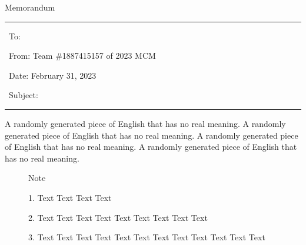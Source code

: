 \documentclass[12pt]{ctexart}
\begin{document}
\begin{letter}{ \centering Memorandum }
	
	\noindent\rule{\textwidth}{1pt}

	\vspace{-0.2cm}

	\noindent \ To: 

	\vspace{-0.2cm}

	\noindent \ From: Team \#1887415157 of 2023 MCM

	\vspace{-0.2cm}

	\noindent \ Date: February 31, 2023

	\vspace{-0.2cm}

	\noindent \ Subject:

	\vspace{-0.4cm}

	\noindent\rule{\textwidth}{1pt}

	A randomly generated piece of English that has no real meaning. A randomly generated piece of English that has no real meaning. A randomly generated piece of English that has no real meaning. A randomly generated piece of English that has no real meaning. 

	\begin{figure}%
	\centering
	\begin{tcolorbox}
		[
		colback=yellow!9!white,%
		colframe=white!75!white,%
		width=7cm,%
		arc=5mm, auto outer arc,
		boxrule=0.5pt,
		]
		
		\vspace{0.2cm}
		
		\begin{center}
			\fontsize{20pt}{1}\selectfont{}
			Note
		\end{center}

		\vspace{-0.2cm}

		1. Text Text Text Text
		
		2. Text Text Text Text Text Text Text Text Text
		
		3. Text Text Text Text Text Text Text Text Text Text Text Text 
		

\end{tcolorbox}
\end{figure}
\end{letter}
\end{document}
